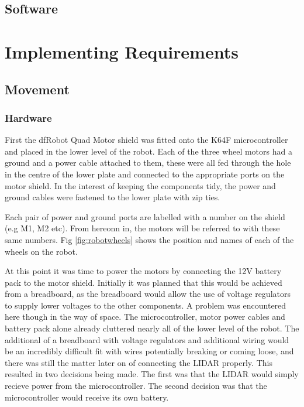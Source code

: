 			
			
			\subsection{Software}
		\section{Implementing Requirements}
			\subsection{Movement}
				\subsubsection{Hardware}
				First the dfRobot Quad Motor shield was fitted onto the K64F microcontroller and placed in the lower level of the robot. Each of the three wheel motors had a ground and a power cable attached to them, these were all fed through the hole in the centre of the lower plate and connected to the appropriate ports on the motor shield. In the interest of keeping the components tidy, the power and ground cables were fastened to the lower plate with zip ties.
				
				Each pair of power and ground ports are labelled with a number on the shield (e.g M1, M2 etc). From hereonn in, the motors will be referred to with these same numbers. Fig \ref{fig:robotwheels} shows the position and names of each of the wheels on the robot.
			
				
				
				
				At this point it was time to power the motors by connecting the 12V battery pack to the motor shield. Initially it was planned that this would be achieved from a breadboard, as the breadboard would allow the use of voltage regulators to supply lower voltages to the other components. A problem was encountered here though in the way of space. The microcontroller, motor power cables and battery pack alone already cluttered nearly all of the lower level of the robot. The additional of a breadboard with voltage regulators and additional wiring would be an incredibly difficult fit with wires potentially breaking or coming loose, and there was still the matter later on of connecting the LIDAR properly. This resulted in two decisions being made. The first was that the LIDAR would simply recieve power from the microcontroller. The second decision was that the microcontroller would receive its own battery.
				
